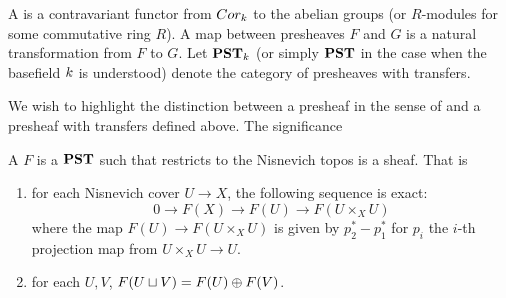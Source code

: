 \begin{defn}\label{def_pst}
A  is a contravariant functor from 
$Cor_k$ to the abelian groups (or $R$-modules for some 
commutative ring $R$). A map between presheaves $F$ and $G$ is a 
natural transformation from $F$ to $G$. Let $\mathbf{PST}_{k}$ (or
simply $\mathbf{PST}$ in the case when the basefield $k$ is 
understood) denote the category of presheaves with transfers.
\end{defn}

\begin{rmk}
We wish to highlight the distinction between a presheaf in the 
sense of \cite{Hart} and a presheaf with transfers defined above.
The significance
\end{rmk}

\begin{defn}\label{def_nis_sheaf}
A  $F$ is a $\mathbf{PST}$ such that restricts to the 
Nisnevich topos is a sheaf. That is 
\begin{enumerate}
\item for each Nisnevich cover $U \to X$, the following sequence 
is exact:
\[
0 \to F(X) \to F(U) \to F(U \times_X U)
\]
where the map $F(U) \to F(U \times_X U)$ is given by $p_2^* - 
p_1^*$ for $p_i$ the $i$-th projection map from $U \times_X U
\to U$.

\item for each $U, V$, $F(U \sqcup V) = F(U) \oplus F(V)$.
\end{enumerate}
\end{defn}
